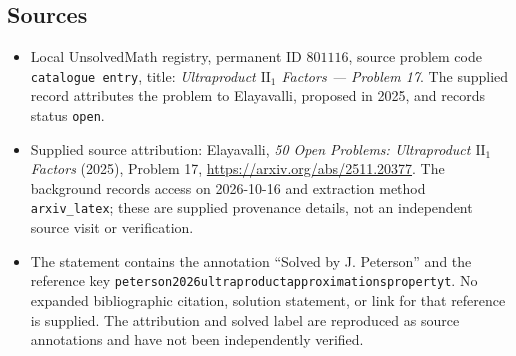 \documentclass[11pt]{article}
\begin{document}
\subsection{Sources}
\begin{itemize}
\item Local UnsolvedMath registry, permanent ID \(801116\), source problem code \texttt{catalogue entry}, title: \emph{Ultraproduct \(\mathrm{II}_1\) Factors --- Problem 17}. The supplied record attributes the problem to Elayavalli, proposed in 2025, and records status \texttt{open}.
\item Supplied source attribution: Elayavalli, \emph{50 Open Problems: Ultraproduct \(\mathrm{II}_1\) Factors} (2025), Problem 17, \url{https://arxiv.org/abs/2511.20377}. The background records access on 2026-10-16 and extraction method \texttt{arxiv\_latex}; these are supplied provenance details, not an independent source visit or verification.
\item The statement contains the annotation ``Solved by J. Peterson'' and the reference key \texttt{peterson2026ultraproductapproximationspropertyt}. No expanded bibliographic citation, solution statement, or link for that reference is supplied. The attribution and solved label are reproduced as source annotations and have not been independently verified.
\end{itemize}
\end{document}
